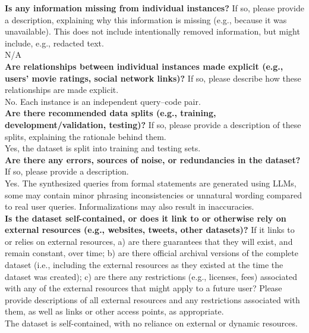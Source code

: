     \textcolor{\sectioncolor}{\textbf{Is any information missing from individual instances?
    }
    If so, please provide a description, explaining why this information is
    missing (e.g., because it was unavailable). This does not include
    intentionally removed information, but might include, e.g., redacted text.
    } \\
    N/A \\
    
    \textcolor{\sectioncolor}{\textbf{Are relationships between individual instances made explicit (e.g., users’
    movie ratings, social network links)?
    }
    If so, please describe how these relationships are made explicit.
    } \\
    No. Each instance is an independent query–code pair. \\
    
    \textcolor{\sectioncolor}{\textbf{Are there recommended data splits (e.g., training, development/validation,
    testing)?
    }
    If so, please provide a description of these splits, explaining the
    rationale behind them.
    } \\
    Yes, the dataset is split into training and testing sets. \\
    
    \textcolor{\sectioncolor}{\textbf{Are there any errors, sources of noise, or redundancies in the dataset?
    }
    If so, please provide a description.
    } \\
    Yes. The synthesized queries from formal statements are generated using LLMs, some may contain minor phrasing inconsistencies or unnatural wording compared to real user queries. Informalizations may also result in inaccuracies.
 \\
    
    \textcolor{\sectioncolor}{\textbf{Is the dataset self-contained, or does it link to or otherwise rely on
    external resources (e.g., websites, tweets, other datasets)?
    }
    If it links to or relies on external resources, a) are there guarantees
    that they will exist, and remain constant, over time; b) are there official
    archival versions of the complete dataset (i.e., including the external
    resources as they existed at the time the dataset was created); c) are
    there any restrictions (e.g., licenses, fees) associated with any of the
    external resources that might apply to a future user? Please provide
    descriptions of all external resources and any restrictions associated with
    them, as well as links or other access points, as appropriate.
    } \\
    The dataset is self-contained, with no reliance on external or dynamic resources. \\
    
